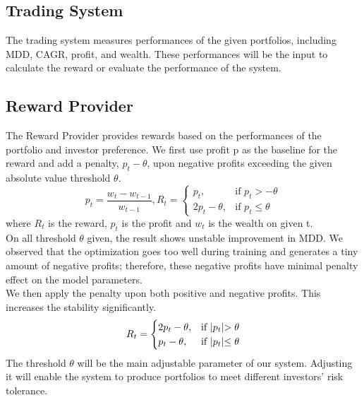 \subsection {Trading System}
The trading system measures performances of the given portfolios, including MDD, CAGR, profit, and wealth. These performances will be the input to calculate the reward or evaluate the performance of the system. 
\subsection {Reward Provider}
The Reward Provider provides rewards based on the performances of the portfolio and investor preference. We first use profit p as the baseline for the reward and add a penalty, \(p_t-\theta\), upon negative profits exceeding the given absolute value threshold \(\theta\). 
\[
p_t = \frac{w_t-w_{t-1}}{w_{t-1}}
, 
R_t = 
\begin{cases}
    p_t,&\text{if  }p_t > -\theta\\
    2p_t - \theta ,&\text{if  }p_t \leq  \theta
\end{cases}
\]
where \(R_t\) is the reward, \(p_t\) is the profit and \(w_t\) is the wealth on given t.
\\
On all threshold \(\theta\) given, the result shows unstable improvement in MDD. We observed that the optimization goes too well during training and generates a tiny amount of negative profits; therefore, these negative profits have minimal penalty effect on the model parameters.
\\
We then apply the penalty upon both positive and negative profits. This increases the stability significantly.
\[
R_t = 
\begin{cases}
    2p_t - \theta,&\text{if  }    $$|p_t|$$ > \theta\\
    p_t - \theta ,&\text{if  } $$|p_t|$$\leq  \theta
\end{cases}
\]
The threshold \(\theta\) will be the main adjustable parameter of our system. Adjusting it will enable the system to produce portfolios to meet different investors' risk tolerance.
